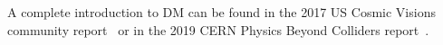 \documentclass[prd,showpacs,groupedaddress,superscriptaddress,amsmath,amssymb]{revtex4-2} %
\begin{document}
A complete introduction to DM can be found in the 2017 US Cosmic Visions community report~\cite{Battaglieri:2017aum}
or in the 2019 CERN Physics Beyond Colliders report~\cite{Beacham:2019nyx}.



\clearpage

%

\end{document}
